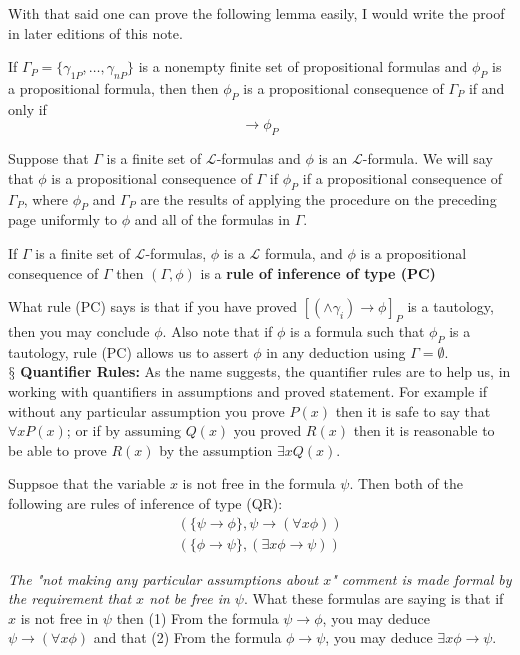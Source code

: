 \documentclass[9pt,a4paper]{article}
\newcommand{\newpoint}[1]{\ \\ \indent$\mathsection$ \textbf{#1}}
\newcommand{\curveL}{\mathcal{L}}
\begin{document}
        With that said one can prove the following lemma easily, I would write the proof in later editions of this note.
        \begin{lemma}
            If $\Gamma_P = \{\gamma_{1P}, \dots, \gamma_{nP}\}$ is a nonempty finite set of propositional formulas and $\phi_P$ is a propositional formula, then then $\phi_P$ is a propositional consequence of $\Gamma_P$ if and only if
            \begin{equation}
                [\gamma_{1P}\land\dots\land\gamma_nP] \rightarrow \phi_P
            \end{equation}
        \end{lemma} 
        \begin{define}
            Suppose that $\Gamma$ is a finite set of $\curveL$-formulas and $\phi$ is an $\curveL$-formula. We will say that $\phi$ is a propositional consequence of $\Gamma$ if $\phi_P$ if a propositional consequence of $\Gamma_P$, where $\phi_P$ and $\Gamma_P$ are the results of applying the procedure on the preceding page uniformly to $\phi$ and all of the formulas in $\Gamma$.
        \end{define}
        \begin{define}
            If $\Gamma$ is  a finite set of $\curveL$-formulas, $\phi$ is a $\curveL$ formula, and $\phi$ is a propositional consequence of $\Gamma$ then $(\Gamma, \phi)$ is a \textbf{rule of inference of type (PC)}
        \end{define}
        What rule (PC) says is that if you have proved $[(\land\gamma_i)\rightarrow \phi]_P$ is a tautology, then you may conclude $\phi$. Also note that if $\phi$ is a formula such that $\phi_P$ is a tautology, rule (PC) allows us to assert $\phi$ in any deduction using $\Gamma = \emptyset$.
        \newpoint{Quantifier Rules:} As the name suggests, the quantifier rules are to help us, in working with quantifiers in assumptions and proved statement. For example if without any particular assumption you prove $P(x)$ then it is safe to say that $\forall x P(x)$; or if by assuming $Q(x)$ you proved $R(x)$ then it is reasonable to be able to prove $R(x)$ by the assumption $\exists x Q(x)$.
        \begin{define}
            Suppsoe that the variable $x$ is not free in the formula $\psi$. Then both of the following are rules of inference of type (QR):
            \begin{align}
                (\{\psi\rightarrow\phi\}, \psi\rightarrow(\forall x\phi))\\
                (\{\phi\rightarrow \psi\}, (\exists x\phi\rightarrow\psi))
            \end{align}
        \end{define}
        \textit{The "not making any particular assumptions about $x$" comment is made formal by the requirement that $x$ not be free in $\psi$}. What these formulas are saying is that if $x$ is not free in $\psi$ then (1) From the formula $\psi\rightarrow \phi$, you may deduce $\psi\rightarrow(\forall x\phi)$ and that (2) From the formula $\phi\rightarrow \psi$, you may deduce $\exists x\phi\rightarrow \psi$.
\end{document}
